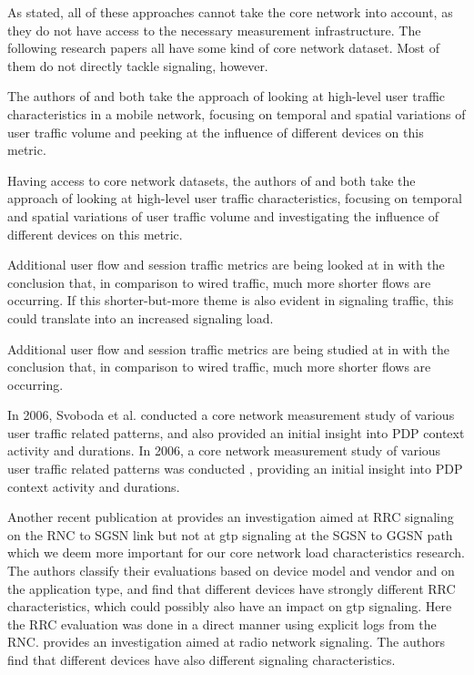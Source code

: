As stated, all of these approaches cannot take the core network into account, as they do not have access to the necessary measurement infrastructure. The following research papers all have some kind of core network dataset. Most of them do not directly tackle signaling, however.

The authors of \cite{shafiq2011characterizing} and \cite{paul2011understanding} both take the approach of looking at high-level user traffic characteristics in a mobile network, focusing on temporal and spatial variations of user traffic volume and peeking at the influence of different devices on this metric. 

Having access to core network datasets, the authors of \cite{shafiq2011characterizing} and \cite{paul2011understanding} both take the approach of looking at high-level user traffic characteristics, focusing on temporal and spatial variations of user traffic volume and investigating the influence of different devices on this metric. 


Additional user flow and session traffic metrics are being looked at in \cite{Zhang:2012:UCC:2377677.2377764} with the conclusion that, in comparison to wired traffic, much more shorter flows are occurring. If this shorter-but-more theme is also evident in signaling traffic, this could translate into an increased signaling load.

Additional user flow and session traffic metrics are being studied at in \cite{Zhang:2012:UCC:2377677.2377764} with the conclusion that, in comparison to wired traffic, much more shorter flows are occurring.


In 2006, Svoboda et al. \cite{svoboda2006composition} conducted a core network measurement study of various user traffic related patterns, and also provided an initial insight into \gls{PDP} context activity and durations.
In 2006, a core network measurement study of various user traffic related patterns was conducted \cite{svoboda2006composition}, providing an initial insight into \gls{PDP} context activity and durations.


Another recent publication at \cite{he2012panoramic} provides an investigation aimed at \gls{RRC} signaling on the \gls{RNC} to \gls{SGSN} link but not at \gls{gtp} signaling at the \gls{SGSN} to \gls{GGSN} path which we deem more important for our core network load characteristics research. The authors classify their evaluations based on device model and vendor and on the application type, and find that different devices have strongly different \gls{RRC} characteristics, which could possibly also have an impact on \gls{gtp} signaling. Here the \gls{RRC} evaluation was done in a direct manner using explicit logs from the \gls{RNC}. 
 \cite{he2012panoramic} provides an investigation aimed at radio network signaling. The authors find that different devices have also different signaling characteristics.


